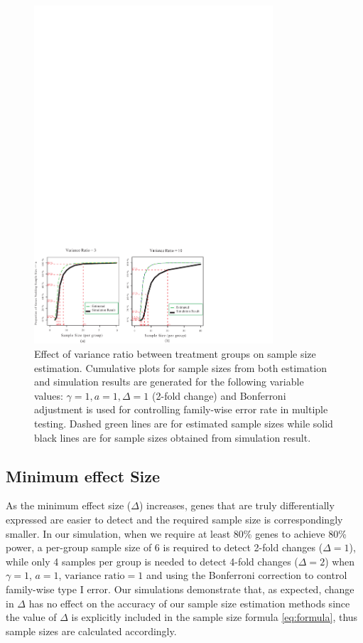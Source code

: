 \documentclass{bioinfo}
\begin{document}
\begin{figure}[h]
  \centerline{\includegraphics*[width=3.5in]{ResVarF.pdf}}
  \caption[Effect of variance ratio between treatment groups on sample size estimation]
  {Effect of variance ratio between treatment groups on sample size estimation.
    Cumulative plots for sample sizes from both estimation and simulation
    results are generated for the following variable values: $\gamma = 1, a = 1, \Delta = 1$ (2-fold
    change) and Bonferroni adjustment is used for controlling family-wise error rate in multiple testing. Dashed green lines are for estimated sample sizes
    while solid black lines are for sample sizes obtained from simulation result.}
  \label{fig:ResVar}
\end{figure}

\subsection{Minimum effect Size}

As the minimum effect size ($\Delta$) increases, genes that are
truly differentially expressed are easier to detect and the
required sample size is correspondingly smaller.  In our
simulation, when we require at least 80\% genes to achieve 80\%
power, a per-group sample size of 6 is required to detect 2-fold
changes ($\Delta = 1$), while only 4 samples per group is needed
to detect 4-fold changes ($\Delta = 2$) when $\gamma=1$, $a=1$,
$\text{variance ratio}=1$ and using the Bonferroni correction to
control family-wise type I error. Our simulations demonstrate
that, as expected, change in $\Delta$ has no effect on the
accuracy of our sample size estimation methods since the value of
$\Delta$ is explicitly included in the sample size formula
\ref{eq:formula}, thus sample sizes are calculated accordingly.
\end{document}
